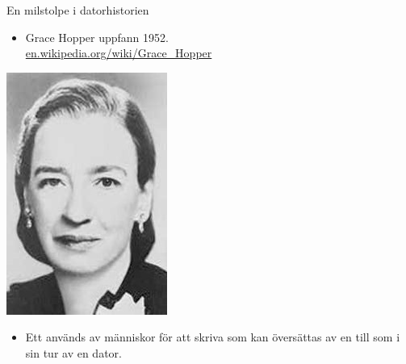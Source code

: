 \documentclass{simpleslides}
\begin{document}
\begin{Slide}{En milstolpe i datorhistorien}
  \begin{minipage}{.8\textwidth}
    \begin{itemize}
    \item Grace Hopper uppfann  1952. \\ \href{https://en.wikipedia.org/wiki/Grace\_Hopper}{en.wikipedia.org/wiki/Grace\_Hopper}
    \end{itemize}
    \end{minipage}%
    \begin{minipage}{.2\textwidth}
    \centering\includegraphics[width=0.6\columnwidth]{../../img/grace}
    \end{minipage}%
  
\begin{itemize}
  \item Ett  används av människor för att skriva  som kan översättas av en  till  som i sin tur  av en dator.
\end{itemize}

\end{Slide}
\end{document}
